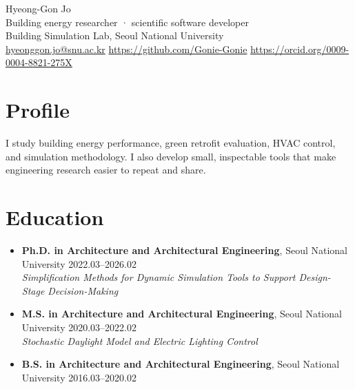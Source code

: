 \documentclass[10pt,a4paper]{article}
\begin{document}
{\LARGE Hyeong-Gon Jo}\\[3pt]
Building energy researcher · scientific software developer\\
Building Simulation Lab, Seoul National University\\
\href{mailto:hyeonggon.jo@snu.ac.kr}{hyeonggon.jo@snu.ac.kr} \quad \url{https://github.com/Gonie-Gonie} \quad \url{https://orcid.org/0009-0004-8821-275X}

\section*{Profile}
I study building energy performance, green retrofit evaluation, HVAC control, and simulation methodology. I also develop small, inspectable tools that make engineering research easier to repeat and share.

\section*{Education}
\begin{itemize}[leftmargin=*,nosep]
\item \textbf{Ph.D. in Architecture and Architectural Engineering}, Seoul National University \hfill 2022.03–2026.02\\\emph{Simplification Methods for Dynamic Simulation Tools to Support Design-Stage Decision-Making}
\item \textbf{M.S. in Architecture and Architectural Engineering}, Seoul National University \hfill 2020.03–2022.02\\\emph{Stochastic Daylight Model and Electric Lighting Control}
\item \textbf{B.S. in Architecture and Architectural Engineering}, Seoul National University \hfill 2016.03–2020.02
\end{itemize}
\end{document}
